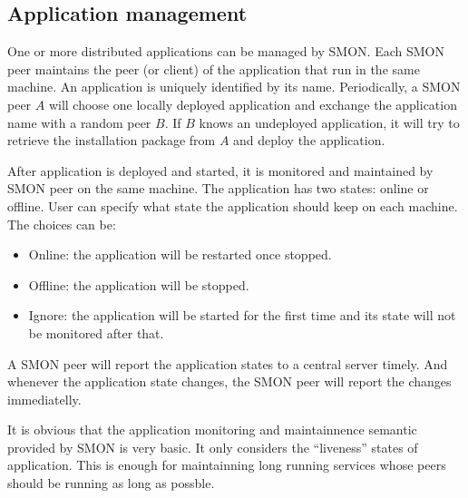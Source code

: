 \subsection{Application management}

One or more distributed applications can be managed by SMON.
Each SMON peer maintains the peer (or client) of the
application that run in the same machine. An application is
uniquely identified by its name.  Periodically, a SMON peer
$A$ will choose one locally deployed application and
exchange the application name with a random peer $B$. If $B$
knows an undeployed application, it will try to retrieve the
installation package from $A$ and deploy the application.



After application is deployed and started, it is monitored
and maintained by SMON peer on the same machine.  The
application has two states: online or offline.  User can
specify what state the application should keep on each
machine. The choices can be:

\begin{itemize}
  \item Online: the application will be restarted once
  stopped.
  \item Offline: the application will be stopped.
  \item Ignore: the application will be started for the
  first time and its state will not be monitored after
  that.
\end{itemize}

A SMON peer will report the application states to a central
server timely. And whenever the application state changes,
the SMON peer will report the changes immediatelly. 

It is obvious that the application monitoring and
maintainnence semantic provided by SMON is very basic. It
only considers the ``liveness'' states of application. This
is enough for maintainning long running services whose peers
should be running as long as possble.

